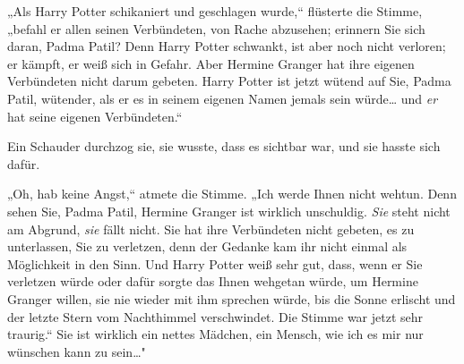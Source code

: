 „Als Harry Potter schikaniert und geschlagen wurde,“ flüsterte die Stimme, „befahl er allen seinen Verbündeten, von Rache abzusehen; erinnern Sie sich daran, Padma Patil? Denn Harry Potter schwankt, ist aber noch nicht verloren; er kämpft, er weiß sich in Gefahr. Aber Hermine Granger hat ihre eigenen Verbündeten nicht darum gebeten. Harry Potter ist jetzt wütend auf Sie, Padma Patil, wütender, als er es in seinem eigenen Namen jemals sein würde… und \emph{er} hat seine eigenen Verbündeten.“

Ein Schauder durchzog sie, sie wusste, dass es sichtbar war, und sie hasste sich dafür.

„Oh, hab keine Angst,“ atmete die Stimme. „Ich werde Ihnen nicht wehtun. Denn sehen Sie, Padma Patil, Hermine Granger ist wirklich unschuldig. \emph{Sie} steht nicht am Abgrund, \emph{sie} fällt nicht. Sie hat ihre Verbündeten nicht gebeten, es zu unterlassen, Sie zu verletzen, denn der Gedanke kam ihr nicht einmal als Möglichkeit in den Sinn. Und Harry Potter weiß sehr gut, dass, wenn er Sie verletzen würde oder dafür sorgte das Ihnen wehgetan würde, um Hermine Granger willen, sie nie wieder mit ihm sprechen würde, bis die Sonne erlischt und der letzte Stern vom Nachthimmel verschwindet. Die Stimme war jetzt sehr traurig.“ Sie ist wirklich ein nettes Mädchen, ein Mensch, wie ich es mir nur wünschen kann zu sein…"

